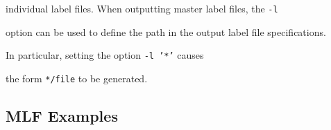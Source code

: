 individual label files.  When outputting master label files,  the \texttt{-l}


option can be used to define the path in the output label file specifications.


In particular, setting the option \texttt{-l '*'} causes


the form \texttt{*/file} to be generated.





\subsection{MLF Examples}








